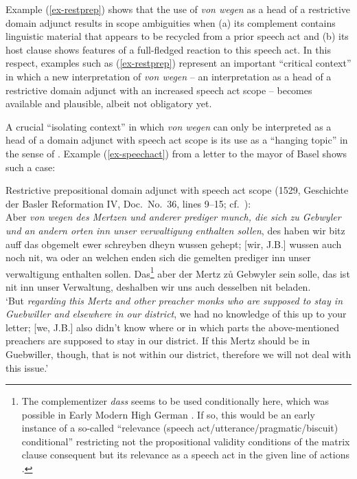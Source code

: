 \documentclass[output=paper
  ,nobabel
  ,draftmode
  ,babelshorthands
  ,colorlinks, citecolor=brown
]{langscibook}
\begin{document}
Example (\ref{ex-restprep}) shows that the use of \emph{von wegen} as a head of a restrictive domain adjunct results in scope ambiguities when (a) its complement contains linguistic material that appears to be recycled from a prior speech act and (b) its host clause shows features of a full-fledged reaction to this speech act. In this respect, examples such as (\ref{ex-restprep}) represent an important ``critical context'' \citep[cf.][]{Diewald2002} in which a new interpretation of \emph{von wegen} -- an interpretation as a head of a restrictive domain adjunct with an increased speech act scope – becomes available and plausible, albeit not obligatory yet.

A crucial ``isolating context'' \citep{Diewald2002} in which \emph{von wegen} can only be interpreted as a head of a domain adjunct with speech act scope is its use as a ``hanging topic'' in the sense of \citet{Altmann1981}. Example (\ref{ex-speechact}) from a letter to the mayor of Basel shows such a case:

\eanoraggedright\label{ex-speechact} Restrictive prepositional domain adjunct with speech act scope (1529, Geschichte der Basler Reformation IV, Doc.\ No.\ 36, lines 9--15; cf.\ \citealp[34]{Roth1941}):\\[2pt]
\sloppy
Aber \emph{von wegen des Mertzen und anderer prediger munch, die sich zu \mbox{Gebwyler} und an andern
  orten inn unser verwaltigung enthalten sollen}, des haben wir bitz auff das obgemelt ewer
schreyben dheyn wussen gehept; [wir, J.B.] wussen auch noch nit, wa oder an welchen enden sich die
gemelten prediger inn unser verwaltigung enthalten sollen. Das\footnote{The complementizer
  \emph{dass} seems to be used conditionally here, which was possible in Early Modern High
  German \citep[cf.][821]{GrimmGrimm1860}. If so, this would be an early instance of a so-called “relevance (speech act/utterance/pragmatic/biscuit) conditional” restricting not the propositional validity conditions of the matrix clause consequent but its relevance as a speech act in the given line of actions \citep[e.g.][]{Austin1956, Sweetser1990,Guenthner1999}.}
aber der Mertz zů Gebwyler sein solle, das ist nit inn unser Verwaltung, deshalben wir uns auch desselben nit beladen. \\
	`But \emph{regarding this Mertz and other preacher monks who are supposed to stay in Guebwiller and elsewhere in our district}, we had no knowledge of this up to your letter; [we, J.B.] also didn’t know where or in which parts the above-mentioned preachers are supposed to stay in our district. If this Mertz should be in Guebwiller, though, that is not within our district, therefore we will not deal with this issue.'
\z
\end{document}

